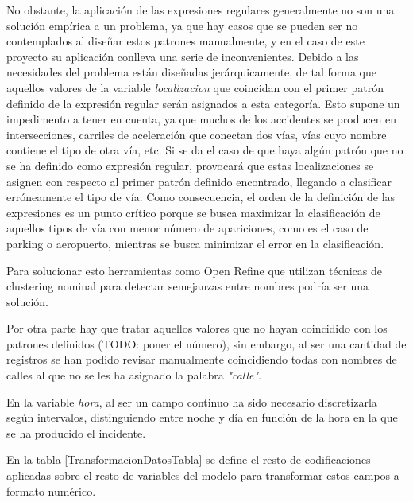 \begin{enumerate}
                    No obstante, la aplicación de las expresiones regulares generalmente no son una solución empírica a un problema, ya que hay casos que se pueden ser no contemplados al diseñar estos patrones manualmente, y en el caso de este proyecto su aplicación conlleva una serie de inconvenientes. Debido a las necesidades del problema están diseñadas jerárquicamente, de tal forma que aquellos valores de la variable \textit{localizacion} que coincidan con el primer patrón definido de la expresión regular serán asignados a esta categoría. Esto supone un impedimento a tener en cuenta, ya que muchos de los accidentes se producen en intersecciones, carriles de aceleración que conectan dos vías, vías cuyo nombre contiene el tipo de otra vía, etc. Si se da el caso de que haya algún patrón que no se ha definido como expresión regular, provocará que estas localizaciones se asignen con respecto al primer patrón definido encontrado, llegando a clasificar erróneamente el tipo de vía. Como consecuencia, el orden de la definición de las expresiones es un punto crítico porque se busca maximizar la clasificación de aquellos tipos de vía con menor número de apariciones, como es el caso de parking o aeropuerto, mientras se busca minimizar el error en la clasificación.


                    Para solucionar esto herramientas como Open Refine \cite{OpenRefine} que utilizan técnicas de clustering nominal para detectar semejanzas entre nombres podría ser una solución.

                    Por otra parte hay que tratar aquellos valores que no hayan coincidido con los patrones definidos (TODO: poner el número), sin embargo, al ser una cantidad de registros se han podido revisar manualmente coincidiendo todas con nombres de calles al que no se les ha asignado la palabra \textit{"calle"}.


                    En la variable \textit{hora}, al ser un campo continuo ha sido necesario discretizarla según intervalos, distinguiendo entre noche y día en función de la hora en la que se ha producido el incidente.


                    En la tabla \ref{TransformacionDatosTabla} se define el resto de codificaciones aplicadas sobre el resto de variables del modelo para transformar estos campos a formato numérico.

                    \def\arraystretch{1.2}%
                    \begin{longtable}{|c|L{0.7\textwidth}|}\\


\end{longtable}
\end{enumerate}
